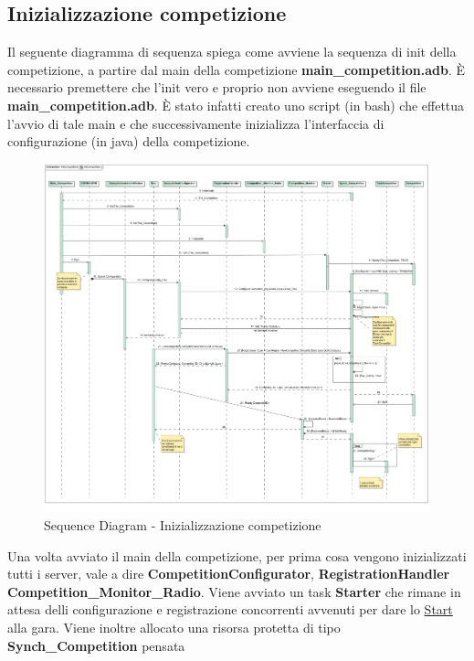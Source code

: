 \subsection{Inizializzazione competizione}
Il seguente diagramma di sequenza spiega come avviene la sequenza di init della competizione, a partire dal main della competizione \textbf{main\_competition.adb}.
\`{E} necessario premettere che l'init vero e proprio non avviene eseguendo il file \textbf{main\_competition.adb}. 
\`{E} stato infatti creato uno script (in bash) che effettua l'avvio di tale main e che successivamente inizializza 
l'interfaccia di configurazione (in java) della competizione.
\begin{center}
\begin{figure}[h!]
\advance\leftskip-3.2cm
	\includegraphics[angle=90,scale=0.35]{img/SequenceDiagrams/InitCompetition.jpg}
\caption{Sequence Diagram - Inizializzazione competizione}
\end{figure}
\end{center}
\clearpage
Una volta avviato il main della competizione, per prima cosa vengono inizializzati tutti i server, vale a dire \textbf{CompetitionConfigurator},
\textbf{RegistrationHandler} \textbf{Competition\_Monitor\_Radio}. Viene avviato un task \textbf{Starter} che rimane in attesa
delli configurazione e registrazione concorrenti avvenuti per dare lo \underline{Start} alla gara. Viene inoltre allocato una risorsa protetta di tipo \textbf{Synch\_Competition} pensata
